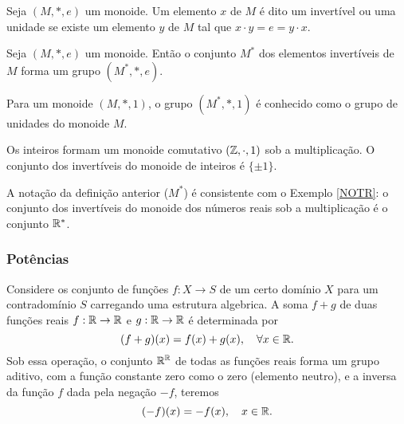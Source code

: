 \begin{definition}[Magma]
\begin{exmp}
         \end{exmp}
         \begin{definition}
            Seja $(M,*,e)$ um monoide. Um elemento $x$ de $M$ é dito um invertível ou uma unidade se existe um elemento $y$ de $M$ tal que $x\cdot y = e = y\cdot x$.
         \end{definition}
         \begin{stat}
            Seja $(M,*,e)$ um monoide. Então o conjunto $M^*$ dos elementos invertíveis de $M$ forma um grupo $(M^*,*,e)$.
         \end{stat}
         \begin{definition}
            Para um monoide $(M,*,1)$, o grupo $(M^*,*,1)$ é conhecido como o grupo de unidades do monoide $M$.
         \end{definition}
         \begin{exmp}
            Os inteiros formam um monoide comutativo $(\mathbb{Z},\cdot , 1)$ sob a multiplicação. O conjunto dos invertíveis do monoide de inteiros é $\{\pm 1\}$.
         \end{exmp}
         \begin{exmp}
            A notação da definição anterior ($M^*$) é consistente com o Exemplo \ref{NOTR}: o conjunto dos invertíveis do monoide dos números reais sob a multiplicação é o conjunto $\mathbb{R}^*$.
         \end{exmp}

      \subsubsection{Potências}
         Considere os conjunto de funções $f: X\to S$ de um certo domínio $X$ para um contradomínio $S$ carregando uma estrutura algebrica. A soma $f + g$ de duas funções reais $f: \mathbb{R} \to \mathbb{R}$ e $g: \mathbb{R} \to \mathbb{R}$ é determinada por
         $$(f+g)(x)=f(x)+g(x),\quad \forall x \in \mathbb{R}.$$ Sob essa operação, o conjunto $\mathbb{R}^{\mathbb{R}}$ de todas as funções reais forma um grupo aditivo, com a função constante zero como o zero (elemento neutro), e a inversa da função $f$ dada pela negação $-f$, teremos
         $$(-f)(x) = -f(x), \quad x\in \mathbb{R}.$$


\end{definition}
